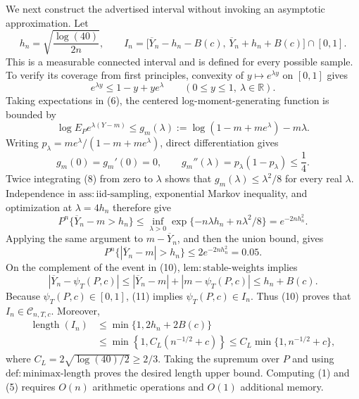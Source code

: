 We next construct the advertised interval without invoking an asymptotic approximation.  Let
\[
h_n=\sqrt{\frac{\log(40)}{2n}},
\qquad
I_n=\bigl[\overline Y_n-h_n-B(c),\,\overline Y_n+h_n+B(c)\bigr]\cap[0,1].
\tag{5}
\]
This is a measurable connected interval and is defined for every possible sample.  To verify its coverage from first principles, convexity of \(y\mapsto e^{\lambda y}\) on \([0,1]\) gives
\[
e^{\lambda y}\leq1-y+ye^\lambda
\qquad(0\leq y\leq1,\ \lambda\in\mathbb R).
\tag{6}
\]
Taking expectations in (6), the centered log-moment-generating function is bounded by
\[
\log E_Pe^{\lambda(Y-m)}
\leq g_m(\lambda)
:=\log(1-m+me^\lambda)-m\lambda.
\tag{7}
\]
Writing \(p_\lambda=me^\lambda/(1-m+me^\lambda)\), direct differentiation gives
\[
g_m(0)=g_m'(0)=0,
\qquad
g_m''(\lambda)=p_\lambda(1-p_\lambda)\leq\frac14.
\tag{8}
\]
Twice integrating (8) from zero to \(\lambda\) shows that \(g_m(\lambda)\leq\lambda^2/8\) for every real \(\lambda\).  Independence in \(\mathrm{ass:iid\text{-}sampling}\), exponential Markov inequality, and optimization at \(\lambda=4h_n\) therefore give
\[
P^n\{\overline Y_n-m>h_n\}
\leq\inf_{\lambda>0}\exp\{-n\lambda h_n+n\lambda^2/8\}
=e^{-2nh_n^2}.
\tag{9}
\]
Applying the same argument to \(m-\overline Y_n\), and then the union bound, gives
\[
P^n\{|\overline Y_n-m|>h_n\}
\leq2e^{-2nh_n^2}=0.05.
\tag{10}
\]
On the complement of the event in (10), \(\mathrm{lem:stable\text{-}weights}\) implies
\[
|\overline Y_n-\psi_T(P,c)|
\leq|\overline Y_n-m|+|m-\psi_T(P,c)|
\leq h_n+B(c).
\tag{11}
\]
Because \(\psi_T(P,c)\in[0,1]\), (11) implies \(\psi_T(P,c)\in I_n\).  Thus (10) proves that \(I_n\in\mathcal C_{n,T,c}\).  Moreover,
\[
\begin{aligned}
\operatorname{length}(I_n)
&\leq\min\{1,2h_n+2B(c)\}\\
&\leq\min\!\left\{1,C_L(n^{-1/2}+c)\right\}
\leq C_L\min\{1,n^{-1/2}+c\},
\end{aligned}
\tag{12}
\]
where \(C_L=2\sqrt{\log(40)/2}\geq2/3\).  Taking the supremum over \(P\) and using \(\mathrm{def:minimax\text{-}length}\) proves the desired length upper bound.  Computing (1) and (5) requires \(O(n)\) arithmetic operations and \(O(1)\) additional memory.

